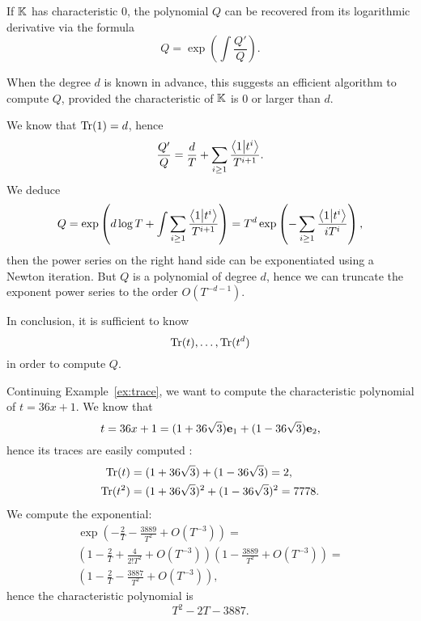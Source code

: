 \begin{remark}
  \label{rk:newton-sums}
  If $\mathbb{K}$ has characteristic $0$, the polynomial $Q$ can be recovered
  from its logarithmic derivative via the formula
  \begin{equation}
    \label{eq:30}
    Q = \exp\left(\int \frac{Q'}{Q}\right)
    \text{.}
  \end{equation}
  

  When the degree $d$ is known in advance, this suggests an efficient
  algorithm to compute $Q$, provided the characteristic of $\mathbb{K}$ is $0$
  or larger than $d$.

  We know that $\operatorname{Tr}(1)=d$, hence 
  \begin{equation}
    \label{eq:32}
    \frac{Q'}{Q} =
    \frac{d}{T} + \sum_{i\ge 1}\frac{\left\langle 1 \middle| t^i \right\rangle}{T^{i+1}} 
    \text{.}
  \end{equation}
  We deduce
  \begin{equation}
    \label{eq:33}
    Q = \exp\left(d\log T + \int\sum_{i\ge1}\frac{\left\langle 1 \middle| t^i \right\rangle}{T^{i+1}}\right) =
    T^d\exp\left(-\sum_{i\ge 1}\frac{\left\langle 1 \middle| t^i \right\rangle}{iT^i}\right)
    \text{,}
  \end{equation}
  then the power series on the right hand side can be exponentiated
  using a Newton iteration.  But $Q$ is a polynomial of degree $d$,
  hence we can truncate the exponent power series to the order
  $O(T^{-d-1})$.

  In conclusion, it is sufficient to know
  \begin{equation}
    \label{eq:34}
    \operatorname{Tr}(t),\ldots,\operatorname{Tr}(t^d)
  \end{equation}
  in order to compute $Q$.
\end{remark}

\begin{example}
  Continuing Example~\ref{ex:trace}, we want to compute the characteristic
  polynomial of $t=36x+1$. We know that
  \[t=36x + 1 = (1+36\sqrt{3})\mathbf{e}_1 + (1-36\sqrt{3})\mathbf{e}_2
  \text{,}\]
  hence its traces are easily computed :
  \begin{align*}
    \operatorname{Tr}(t) &= (1 + 36\sqrt{3}) + (1-36\sqrt{3}) = 2\text{,}\\
    \operatorname{Tr}(t^2) &= (1 + 36\sqrt{3})^2 + (1-36\sqrt{3})^2 = 7778\text{.}
  \end{align*}
  We compute the exponential:
  \begin{multline*}
    \exp\left(-\frac{2}{T}-\frac{3889}{T^2} + O(T^{-3})\right)=\\
    \left(1-\frac{2}{T}+\frac{4}{2!T^2}+O(T^{-3})\right)\left(1-\frac{3889}{T^2}+O(T^{-3})\right)=\\
    \left(1 - \frac{2}{T} - \frac{3887}{T^2} + O(T^{-3})\right)
    \text{,}
  \end{multline*}
  hence the characteristic polynomial is
  \[T^2-2T-3887\text{.}\]
\end{example}

